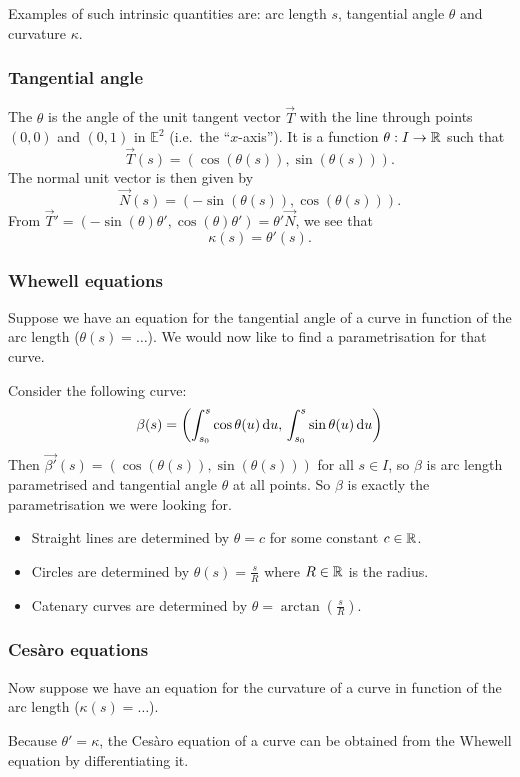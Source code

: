 Examples of such intrinsic quantities are: arc length $s$, tangential angle $\theta$ and curvature $\kappa$.
\subsubsection{Tangential angle}
The  $\theta$ is the angle of the unit tangent vector $\vec{T}$ with the line through points $(0,0)$ and $(0,1)$ in $\mathbb{E}^2$ (i.e.\ the ``$x$-axis''). It is a function $\theta: I \to \mathbb{R}$ such that
\[ \vec{T}(s) = (\cos(\theta(s)), \sin(\theta(s))). \]
The normal unit vector is then given by
\[ \vec{N}(s) = (-\sin(\theta(s)), \cos(\theta(s))). \]
From $\vec{T}' = (-\sin(\theta)\theta', \cos(\theta)\theta') = \theta'\vec{N}$, we see that
\[ \kappa(s) = \theta'(s). \]

\subsubsection{Whewell equations}
Suppose we have an equation for the tangential angle of a curve in function of the arc length ($\theta(s) = \ldots$). We would now like to find a parametrisation for that curve.

Consider the following curve:
\[ \beta(s) = \left(\int_{s_0}^s\cos\theta(u) \operatorname{d \!}{u},\, \int^s_{s_0}\sin\theta(u) \operatorname{d \!}{u}\right) \]
Then $\vec{\beta'}(s) = (\cos(\theta(s)),\sin(\theta(s)))$ for all $s\in I$, so $\beta$ is arc length parametrised and tangential angle $\theta$ at all points. So $\beta$ is exactly the parametrisation we were looking for.

\begin{example}
\begin{itemize}
\item Straight lines are determined by $\theta = c$ for some constant $c\in\mathbb{R}$.
\item Circles are determined by $\theta(s) = \frac{s}{R}$ where $R\in \mathbb{R}$ is the radius.
\item Catenary curves are determined by $\theta = \arctan \left(\frac{s}{R}\right)$.
\end{itemize}
\end{example}
\subsubsection{Cesàro equations}
Now suppose we have an equation for the curvature of a curve in function of the arc length ($\kappa(s) = \ldots$).

Because $\theta' = \kappa$, the Cesàro equation of a curve can be obtained from the Whewell equation by differentiating it.

